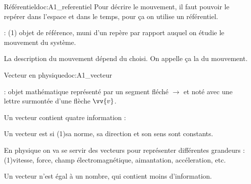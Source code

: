 \newpage
\vspace*{-34pt}
\begin{doc}{Référentiel}{doc:A1_referentiel}
  Pour décrire le mouvement, il faut pouvoir le repérer dans l’espace et dans le temps, pour ça on utilise un référentiel.
  
  \begin{importants}
     : \texteTrou(1){
      objet de référence, muni d'un repère par rapport auquel on étudie le mouvement du système.
    }
  \end{importants}
  
  \begin{importants}
    La description du mouvement dépend du  choisi.
    On appelle ça la  du mouvement.
  \end{importants}
\end{doc}



\vspace*{-8pt}
\begin{doc}{Vecteur en physique}{doc:A1_vecteur}
  \begin{importants}
     : objet mathématique représenté par un segment fléché $\longrightarrow$ et noté avec une lettre surmontée d'une flèche $\vv{v}$.
    
    Un vecteur contient quatre information : 
    \begin{listePoints}[2]
      \item {}
      \item {}
      \item {}
      \item {}
    \end{listePoints}
  
    Un vecteur est  si
    \texteTrou(1){sa norme, sa direction et son sens sont constants.}
  \end{importants}
  
  \fleche En physique on va se servir des vecteurs pour représenter différentes grandeurs :
  \texteTrou(1){vitesse, force, champ électromagnétique, aimantation, accéleration, etc.}
  
  \attention Un vecteur n'est  égal à un nombre, qui contient moins d'information.
\end{doc}


